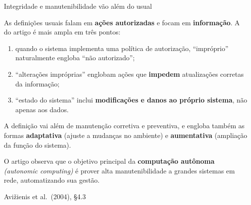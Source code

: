 \documentclass{beamer}
\newcommand{\en}[1]{{\color{depCinza}\textit{#1}}}
\newcommand{\sect}[1]{\par\smallskip\hfill{\tiny\color{black!55}Avi\v{z}ienis et al.\ (2004), #1}}
\begin{document}
\begin{frame}{Integridade e manutenibilidade v\~ao al\'em do usual}
    \footnotesize
    \begin{tcolorbox}[colback=depAzul!5,colframe=depAzul!65,boxrule=0.6pt,title={\scriptsize\bfseries Integridade: ``aus\^encia de altera\c{c}\~oes impr\'oprias do estado do sistema''}]
        \scriptsize
        As defini\c{c}\~oes usuais falam em \textbf{a\c{c}\~oes autorizadas} e focam em \textbf{informa\c{c}\~ao}. A do artigo \'e mais ampla em tr\^es pontos:
        \begin{enumerate}
            \item quando o sistema implementa uma pol\'itica de autoriza\c{c}\~ao, ``impr\'oprio'' naturalmente engloba ``n\~ao autorizado'';
            \item ``altera\c{c}\~oes impr\'oprias'' englobam a\c{c}\~oes que \textbf{impedem} atualiza\c{c}\~oes corretas da informa\c{c}\~ao;
            \item ``estado do sistema'' inclui \textbf{modifica\c{c}\~oes e danos ao pr\'oprio sistema}, n\~ao apenas aos dados.
        \end{enumerate}
    \end{tcolorbox}
    \smallskip
    \begin{tcolorbox}[colback=depVerde!6,colframe=depVerde!60,boxrule=0.6pt,title={\scriptsize\bfseries Manutenibilidade: quatro formas, n\~ao duas}]
        \scriptsize
        A defini\c{c}\~ao vai al\'em de manuten\c{c}\~ao corretiva e preventiva, e engloba tamb\'em as formas \textbf{adaptativa} (ajuste a mudan\c{c}as no ambiente) e \textbf{aumentativa} (amplia\c{c}\~ao da fun\c{c}\~ao do sistema).
    \end{tcolorbox}
    \smallskip
    {\scriptsize O artigo observa que o objetivo principal da \textbf{computa\c{c}\~ao aut\^onoma} \en{(autonomic computing)} \'e prover alta manutenibilidade a grandes sistemas em rede, automatizando sua gest\~ao.}
    \sect{\S4.3}
\end{frame}
\end{document}
